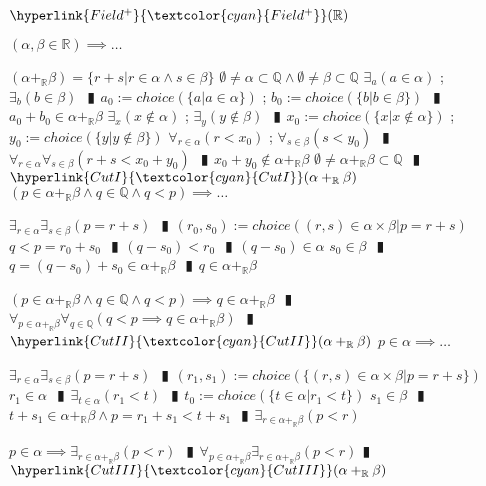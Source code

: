 \documentclass{book}
\newcommand{\wff}[1]{\hypertarget{#1}{\fbox{\textcolor{red}{$#1$}}\phantom{--}}}
\newcommand{\rf}[1]{\hyperlink{#1}{\textcolor{cyan}{#1}}}
\newcommand{\abr}{:=}
\newcommand{\pipe}{$\phantom{(}\vrectangleblack\phantom{)}$}
\begin{document}
\wff{Field+R} $\rf{Field^+}(\mathbb{R})$
\begin{enumerate}
  \lit $(\alpha, \beta \in \mathbb{R}) \implies \ldots$
  \begin{enumerate}
    \lit $(\alpha +_{\mathbb{R}} \beta) = \{r + s | r \in \alpha \land s \in \beta\}$
    \lit $\emptyset \neq \alpha \subset \mathbb{Q} \land \emptyset \neq \beta \subset \mathbb{Q}$
    \lit $\exists_{a}(a \in \alpha)$ ; $\exists_{b}(b \in \beta)$ \pipe $a_0 \abr choice(\{a | a \in \alpha\})$ ; $b_0 \abr choice(\{b | b \in \beta\})$ \pipe $a_0  + b_0 \in \alpha +_{\mathbb{R}} \beta$
    \lit $\exists_{x}(x \notin \alpha)$ ; $\exists_{y}(y \notin \beta)$ \pipe $x_0 \abr choice(\{x | x \notin \alpha\})$ ; $y_0 \abr choice(\{y | y \notin \beta\})$
    \lit $\forall_{r \in \alpha}(r < x_0)$ ; $\forall_{s \in \beta}(s < y_0)$ \pipe $\forall_{r \in \alpha} \forall_{s \in \beta}(r + s < x_0 + y_0)$ \pipe $x_0 + y_0 \not \in \alpha +_{\mathbb{R}} \beta$
    \lit $\emptyset \neq \alpha +_{\mathbb{R}} \beta \subset \mathbb{Q}$ \pipe $\rf{CutI}(\alpha +_{\mathbb{R}} \beta)$
    \lit $(p \in \alpha +_{\mathbb{R}} \beta \land q \in \mathbb{Q} \land q < p) \implies \ldots$
    \begin{enumerate}
      \lit $\exists_{r \in \alpha} \exists_{s \in \beta}(p = r + s)$ \pipe $(r_0, s_0) \abr choice({(r, s) \in \alpha \times \beta | p = r + s})$
      \lit $q < p = r_0 + s_0$ \pipe $(q - s_0) < r_0$ \pipe $(q - s_0) \in \alpha$
      \lit $s_0 \in \beta$ \pipe $q = (q - s_0) + s_0 \in \alpha +_{\mathbb{R}} \beta$ \pipe $q \in \alpha +_{\mathbb{R}} \beta$
    \end{enumerate}
    \lit $(p \in \alpha +_{\mathbb{R}} \beta \land q \in \mathbb{Q} \land q < p) \implies q \in \alpha +_{\mathbb{R}} \beta$ \pipe $\forall_{p \in \alpha +_{\mathbb{R}} \beta} \forall_{q \in \mathbb{Q}}(q < p \implies q \in \alpha +_{\mathbb{R}} \beta)$ \pipe $\rf{CutII}(\alpha +_{\mathbb{R}} \beta)$
    \lit $p \in \alpha \implies \ldots$
    \begin{enumerate}
      \lit $\exists_{r \in \alpha} \exists_{s \in \beta}(p = r + s)$ \pipe $(r_1, s_1) \abr choice(\{(r, s) \in \alpha \times \beta | p = r + s\})$
      \lit $r_1 \in \alpha$ \pipe $\exists_{t \in \alpha}(r_1 < t)$ \pipe $t_0 \abr choice(\{t \in \alpha | r_1 < t\})$
      \lit $s_1 \in \beta$ \pipe $t + s_1 \in \alpha +_{\mathbb{R}} \beta \land p = r_1 + s_1 < t + s_1$ \pipe $\exists_{r \in \alpha +_{\mathbb{R}} \beta}(p < r)$
    \end{enumerate}
    \lit $p \in \alpha \implies \exists_{r \in \alpha +_{\mathbb{R}} \beta}(p < r)$ \pipe $\forall_{p \in \alpha +_{\mathbb{R}} \beta} \exists_{r \in \alpha +_{\mathbb{R}} \beta}(p < r)$\pipe $\rf{CutIII}(\alpha +_{\mathbb{R}} \beta)$

\end{enumerate}
\end{enumerate}
\end{document}
